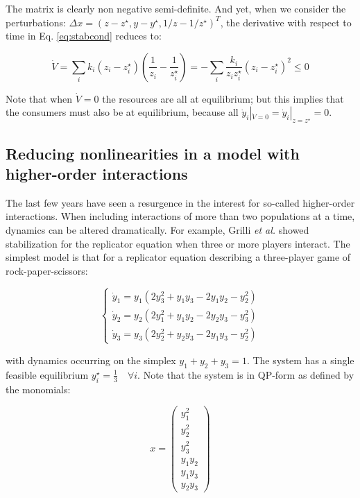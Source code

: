 \documentclass{article}
\begin{document}
The matrix is clearly non negative semi-definite. And yet, when we
consider the perturbations:
\(\Delta x = (z - z^\star, y - y^\star, 1 / z - 1 / z^\star)^T\), the
derivative with respect to time in Eq. \ref{eq:stabcond} reduces to:

\begin{equation}
\dot{V} = \sum_i k_i (z_i - z_i^\star) \left( \frac{1}{z_i} - \frac{1}{z_i^\star} \right) = - \sum_i \frac{k_i}{z_i z_i^\star} (z_i - z_i^\star)^2 \leq 0
\end{equation}

Note that when \(\dot{V} = 0\) the resources are all at equilibrium; but
this implies that the consumers must also be at equilibrium, because all
\(\dot{y}_i|_{\dot{V} = 0} = \dot{y}_i|_{z = z^\star} = 0\).

\hypertarget{reducing-nonlinearities-in-a-model-with-higher-order-interactions}{%
\subsection{Reducing nonlinearities in a model with higher-order
interactions}\label{reducing-nonlinearities-in-a-model-with-higher-order-interactions}}

\label{sec:hoi}

The last few years have seen a resurgence in the interest for so-called
higher-order interactions. When including interactions of more than two
populations at a time, dynamics can be altered dramatically. For
example, Grilli \textit{et al.} showed stabilization for the replicator
equation when three or more players interact. The simplest model is that
for a replicator equation describing a three-player game of
rock-paper-scissors:

\begin{equation}
\label{eq:rpshoi}
\begin{cases}
\dot{y}_1 = y_1 (2 y_3^2 + y_1 y_3 - 2 y_1 y_2 - y_2^2)\\
\dot{y}_2 = y_2 (2 y_1^2 + y_1 y_2 - 2 y_2 y_3 - y_3^2)\\
\dot{y}_3 = y_3 (2 y_2^2 + y_2 y_3 - 2 y_1 y_3 - y_2^2)
\end{cases}
\end{equation}

with dynamics occurring on the simplex \(y_1 + y_2 + y_3 = 1\). The
system has a single feasible equilibrium
\(y_i^\star = \frac{1}{3} \quad \forall i\). Note that the system is in
QP-form as defined by the monomials:

\begin{equation}
\label{eq:rpshoimon}
x = 
\begin{pmatrix}
y_1^2\\ y_2^2 \\ y_3^2 \\ y_1 y_2 \\ y_1 y_3 \\ y_2 y_3
\end{pmatrix} 
\end{equation}
\end{document}
